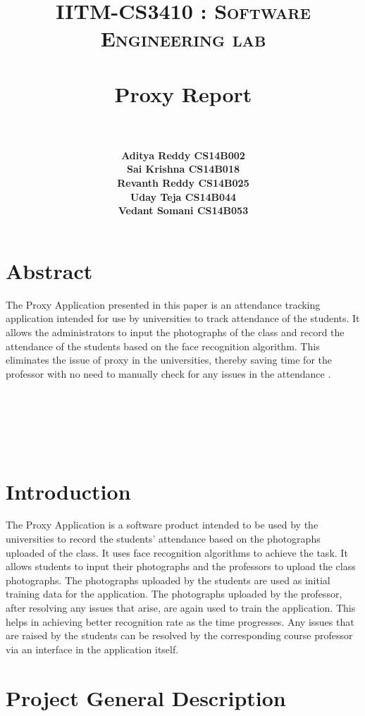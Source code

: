 \documentclass[paper=a4, fontsize=15pt]{scrartcl}
\title{
		\usefont{OT1}{bch}{b}{n}
		\normalfont \normalsize \textsc{IITM-CS3410 : Software Engineering lab} \\ [25pt]
		\horrule{0.5pt} \\[0.4cm]
		\huge Proxy Report \\
		\horrule{2pt} \\[0.5cm]
}
\author{
		\normalfont 								\normalsize
        \textbf{Aditya Reddy CS14B002}\\[-3pt]		\normalsize
        \textbf{Sai Krishna CS14B018}\\[-3pt]		\normalsize
        \textbf{Revanth Reddy CS14B025}\\[-3pt]		\normalsize
        \textbf{Uday Teja CS14B044}\\[-3pt]		\normalsize
        \textbf{Vedant Somani CS14B053}\\[-3pt]		\normalsize
        \normalfont
}
\date{}
\begin{document}
\maketitle

\section{Abstract}



The Proxy Application presented in this paper is an attendance tracking application intended for use by universities to track attendance of the students. It allows the administrators to input the photographs of the class and record the attendance of the students based on the face recognition algorithm. This eliminates the issue of proxy in the universities, thereby saving time for the professor with no need to manually check for any issues in the attendance .
\\
\\
\\
\\
\\
\\
\section{Introduction}

\begin{multicols}{2}

The Proxy Application is a software product intended to be used by the universities to record the students' attendance based on the photographs uploaded of the class. It uses face recognition algorithms to achieve the task. It allows students to input their photographs and the professors to upload the class photographs. The photographs uploaded by the students are used as initial training data for the application. The photographs uploaded by the professor, after resolving any issues that arise, are again used to train the application. This helps in achieving better recognition rate as the time progresses. Any issues that are raised by the students can be resolved by the corresponding course professor via an interface in the application itself.

\end{multicols}


\section{Project General Description}
\end{document}
